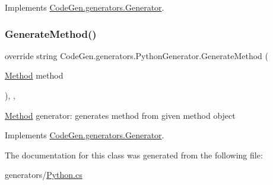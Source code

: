 Implements \mbox{\hyperlink{classCodeGen_1_1generators_1_1Generator_a0d1a48aedbca08c05af734a43739d1c3}{Code\+Gen.\+generators.\+Generator}}.

\mbox{\label{classCodeGen_1_1generators_1_1PythonGenerator_a09ea61b8eb384efcc36aa3574f9cb6a8}} 
\subsubsection{\texorpdfstring{Generate\+Method()}{GenerateMethod()}}
{\footnotesize\ttfamily override string Code\+Gen.\+generators.\+Python\+Generator.\+Generate\+Method (\begin{DoxyParamCaption}\item[{\mbox{\hyperlink{classCodeGen_1_1generators_1_1Method}{Method}}}]{method }\end{DoxyParamCaption})\hspace{0.3cm}{\ttfamily [inline]}, {\ttfamily [protected]}, {\ttfamily [virtual]}}



\mbox{\hyperlink{classCodeGen_1_1generators_1_1Method}{Method}} generator\+: generates method from given method object  



Implements \mbox{\hyperlink{classCodeGen_1_1generators_1_1Generator_a04fc9bd217b3b8c3d5f7b1a3f92c79d3}{Code\+Gen.\+generators.\+Generator}}.



The documentation for this class was generated from the following file\+:\begin{DoxyCompactItemize}
\item 
generators/\mbox{\hyperlink{Python_8cs}{Python.\+cs}}\end{DoxyCompactItemize}
